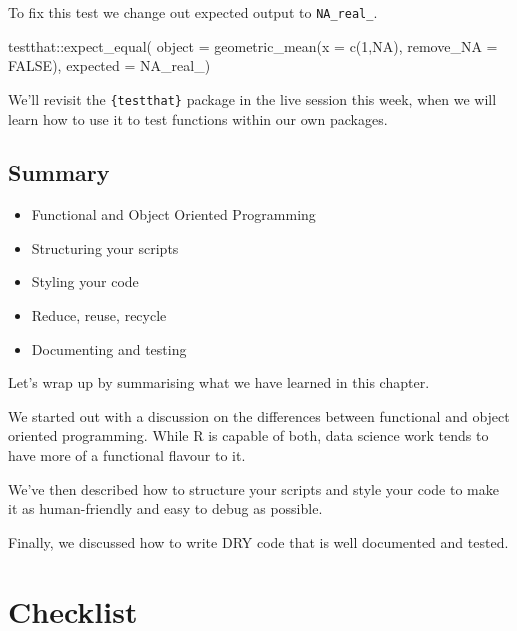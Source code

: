 \documentclass[
  12pt,
]{book}
\newenvironment{Shaded}{\begin{snugshade}}{\end{snugshade}}
\newcommand{\AttributeTok}[1]{\textcolor[rgb]{0.77,0.63,0.00}{#1}}
\newcommand{\ConstantTok}[1]{\textcolor[rgb]{0.00,0.00,0.00}{#1}}
\newcommand{\DecValTok}[1]{\textcolor[rgb]{0.00,0.00,0.81}{#1}}
\newcommand{\FunctionTok}[1]{\textcolor[rgb]{0.00,0.00,0.00}{#1}}
\newcommand{\NormalTok}[1]{#1}
\newcommand{\SpecialCharTok}[1]{\textcolor[rgb]{0.00,0.00,0.00}{#1}}
\providecommand{\tightlist}{%
  \setlength{\itemsep}{0pt}\setlength{\parskip}{0pt}}
\begin{document}
To fix this test we change out expected output to \texttt{NA\_real\_}.

\begin{Shaded}
\begin{Highlighting}[]
\NormalTok{testthat}\SpecialCharTok{::}\FunctionTok{expect\_equal}\NormalTok{(}
  \AttributeTok{object =} \FunctionTok{geometric\_mean}\NormalTok{(}\AttributeTok{x =} \FunctionTok{c}\NormalTok{(}\DecValTok{1}\NormalTok{,}\ConstantTok{NA}\NormalTok{), }\AttributeTok{remove\_NA =} \ConstantTok{FALSE}\NormalTok{),}
  \AttributeTok{expected =} \ConstantTok{NA\_real\_}\NormalTok{)}
\end{Highlighting}
\end{Shaded}

We'll revisit the \texttt{\{testthat\}} package in the live session this week, when we will learn how to use it to test functions within our own packages.

\hypertarget{summary-1}{%
\section{Summary}\label{summary-1}}

\begin{itemize}
\tightlist
\item
  Functional and Object Oriented Programming
\item
  Structuring your scripts
\item
  Styling your code
\item
  Reduce, reuse, recycle
\item
  Documenting and testing
\end{itemize}

Let's wrap up by summarising what we have learned in this chapter.

We started out with a discussion on the differences between functional and object oriented programming. While R is capable of both, data science work tends to have more of a functional flavour to it.

We've then described how to structure your scripts and style your code to make it as human-friendly and easy to debug as possible.

Finally, we discussed how to write DRY code that is well documented and tested.

\hypertarget{workflows-checklist}{%
\chapter*{Checklist}\label{workflows-checklist}}
\end{document}
